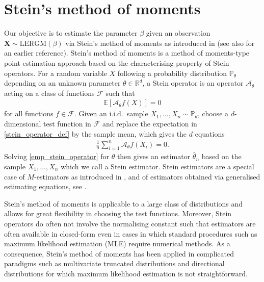 \documentclass{article}
\begin{document}
\section{Stein's method of moments}\label{section_steins_metod_of_moments}
Our objective is to estimate the parameter $\beta$ given an observation $\mathbf{X} \sim \mathrm{LERGM}(\beta)$ via Stein's method of moments as introduced in \cite{ebner2025stein} (see also \cite{arnold2001multivariate} for an earlier reference). Stein's method of moments is a method of moments-type point estimation approach based on the characterising property of Stein operators. For a random variable $X$ following a probability distribution $\mathbb{P}_{\theta}$ depending on an unknown parameter $\theta \in \mathbb{R}^d$, a Stein operator is an operator $\mathcal{A}_{\theta}$ acting on a class of functions $\mathcal{F}$ such that
\begin{align} \label{stein_operator_def}
    \mathbb{E}[\mathcal{A}_{\theta}f(X)] = 0
\end{align}
for all functions $f \in \mathcal{F}$. Given an i.i.d.\ sample $X_1, \ldots, X_n \sim \mathbb{P}_{\theta}$, choose a $d$-dimensional test function in $\mathcal{F}$ and replace the expectation in \eqref{stein_operator_def} by the sample mean, which gives the $d$ equations
\begin{align} \label{emp_stein_operator}
    \frac{1}{n}\sum_{i=1}^n \mathcal{A}_{\theta}f(X_i) = 0.
\end{align}
Solving \eqref{emp_stein_operator} for $\theta$ then gives an estimator $\hat{\theta}_n$ based on the sample $X_1, \ldots, X_n$ which we call a Stein estimator. Stein estimators are a special case of $M$-estimators as introduced in \cite{huber1964robust}, and of estimators obtained via generalised estimating equations, see \cite{liang1986longitudinal}.


Stein's method of moments is applicable to a large class of distributions and allows for great flexibility in choosing the test functions. Moreover, Stein operators do often not involve the normalising constant such that estimators are often available in closed-form even in cases in which  standard procedures such as maximum likelihood estimation (MLE) require numerical methods. As a consequence, Stein's method of moments has been applied in complicated paradigms such as multivariate truncated distributions \cite{fischer2025stein} and directional distributions \cite{fischer2026stein} for which maximum likelihood estimation is not straightforward. \par
\end{document}
